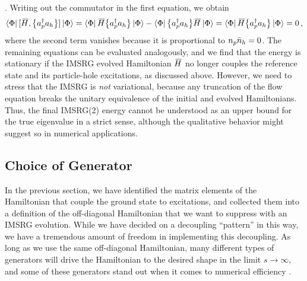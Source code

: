 {\cite{Mukherjee:2001uq,Kutzelnigg:2002kx,Kutzelnigg:2004vn,Kutzelnigg:2004ys}. 
Writing out the commutator in the first equation, we obtain
\begin{equation}
  \langle{\Phi}|\,{[{\mkern 3mu\overline{\mkern-3muH}},{\big\{a^\dag_{p}a_{h}\big\}}]}\,|{\Phi}\rangle 
    = \langle{\Phi}|\,{\mkern 3mu\overline{\mkern-3muH}\big\{a^\dag_{p}a_{h}\big\}}\,|{\Phi}\rangle - \langle{\Phi}|\,{\big\{a^\dag_{p}a_{h}\big\}\mkern 3mu\overline{\mkern-3muH}}\,|{\Phi}\rangle
    = \langle{\Phi}|\,{\mkern 3mu\overline{\mkern-3muH}\big\{a^\dag_{p}a_{h}\big\}}\,|{\Phi}\rangle 
    = 0\,,
\end{equation}
where the second term vanishes because it is proportional to $n_p \bar{n}_h = 0$.
The remaining equations can be evaluated analogously, and we find that the
energy is stationary if the IMSRG evolved Hamiltonian $\mkern 3mu\overline{\mkern-3muH}$ no longer 
couples the reference state and its particle-hole excitations, as discussed 
above. However, we need to stress that the IMSRG is \emph{not} variational,
because any truncation of the flow equation breaks the unitary equivalence
of the initial and evolved Hamiltonians. Thus, the final IMSRG(2) energy
cannot be understood as an upper bound for the true eigenvalue in a strict
sense, although the qualitative behavior might suggest so in numerical
applications.

\subsection{\label{sec:imsrg_generator}Choice of Generator}
In the previous section, we have identified the matrix elements of the
Hamiltonian that couple the ground state to excitations, and collected
them into a definition of the off-diagonal Hamiltonian that we want to 
suppress with an IMSRG evolution. While we have decided on a decoupling 
``pattern'' in this way, we have a tremendous amount of freedom in 
implementing this decoupling. As long as we use the same off-diagonal
Hamiltonian, many different types of generators will drive the Hamiltonian
to the desired shape in the limit $s\to\infty$, and some of these generators
stand out when it comes to numerical efficiency \cite{Hergert:2016jk}. 

%
%
}
